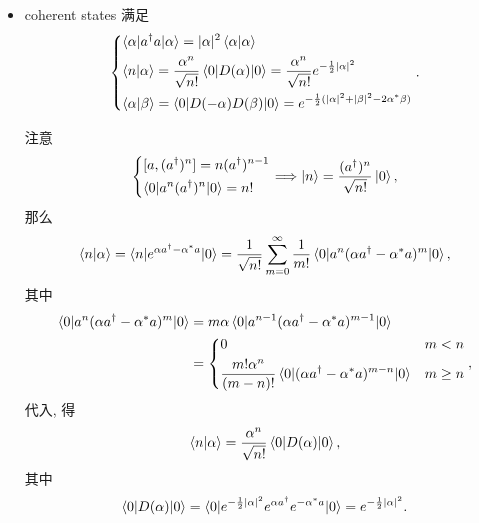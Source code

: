 \documentclass[10pt, a4paper]{article}
\numberwithin{equation}{section}
\begin{document}
\begin{itemize}
		\item coherent states 满足
		\begin{equation}
			\begin{dcases}
				\braket{\alpha | a^\dag a | \alpha} = |\alpha|^2 \braket{\alpha | \alpha} \\
				\braket{n | \alpha} = \frac{\alpha^n}{\sqrt{n!}} \braket{0 | D(\alpha) | 0} = \frac{\alpha^n}{\sqrt{n!}} e^{- \frac{1}{2} |\alpha|^2} \\
				\braket{\alpha | \beta} = \braket{0 | D(- \alpha) D(\beta) | 0} = e^{- \frac{1}{2} (|\alpha|^2 + |\beta|^2 - 2 \alpha^* \beta)}
			\end{dcases}.
		\end{equation}
		
		\begin{tcolorbox}[title=calculation:]
			注意
			\begin{equation}
				\begin{dcases}
					[a, (a^\dag)^n] = n (a^\dag)^{n - 1} \\
					\braket{0 | a^n (a^\dag)^n | 0} = n!
				\end{dcases} \Longrightarrow \ket{n} = \frac{(a^\dag)^n}{\sqrt{n!}} \ket{0},
			\end{equation}
			那么
			\begin{equation}
				\braket{n | \alpha} = \braket{n | e^{\alpha a^\dag - \alpha^* a} | 0} = \frac{1}{\sqrt{n!}} \sum_{m = 0}^\infty \frac{1}{m!} \braket{0 | a^n (\alpha a^\dag - \alpha^* a)^m | 0},
			\end{equation}
			其中
			\begin{align}
				\braket{0 | a^n (\alpha a^\dag - \alpha^* a)^m | 0} &= m \alpha \braket{0 | a^{n - 1} (\alpha a^\dag - \alpha^* a)^{m - 1} | 0} \notag \\
				&= \begin{dcases}
					0 & m < n \\
					\frac{m! \alpha^n}{(m - n)!} \braket{0 | (\alpha a^\dag - \alpha^* a)^{m - n} | 0} & m \geq n
				\end{dcases},
			\end{align}
			代入, 得
			\begin{equation}
				\braket{n | \alpha} = \frac{\alpha^n}{\sqrt{n!}} \braket{0 | D(\alpha) | 0},
			\end{equation}
			其中
			\begin{align}
				\braket{0 | D(\alpha) | 0} = \braket{0 | e^{- \frac{1}{2} |\alpha|^2} e^{\alpha a^\dag} e^{- \alpha^* a} | 0} = e^{- \frac{1}{2} |\alpha|^2}.
			\end{align}
		\end{tcolorbox}
		

\end{itemize}
\end{document}

